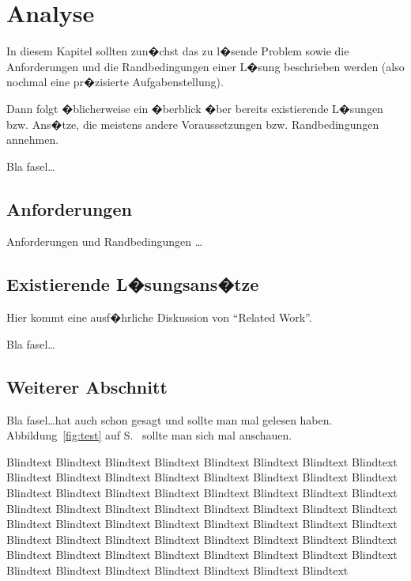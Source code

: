 
\chapter{Analyse}
\label{ch:Analyse}
In diesem Kapitel sollten zun�chst das zu l�sende Problem
sowie die Anforderungen und die Randbedingungen
einer L�sung beschrieben werden (also nochmal
eine pr�zisierte Aufgabenstellung).

Dann folgt �blicherweise ein �berblick �ber bereits existierende
L�sungen bzw. Ans�tze, die meistens andere Voraussetzungen bzw.
Randbedingungen annehmen.

Bla fasel\ldots

\section{Anforderungen}
\label{ch:Analyse:sec:Anforderungen}
Anforderungen und Randbedingungen \ldots

\section{Existierende L�sungsans�tze}
\label{ch:Analyse:sec:RelatedWork}

Hier kommt eine ausf�hrliche Diskussion
von "`Related Work"'.

Bla fasel\ldots

\section{Weiterer Abschnitt}
\label{ch:Analyse:sec:Abschnitt}

Bla fasel\ldots hat auch schon \cite{TB2000} gesagt und
\cite{TB98,JSAC96,qosr} sollte man mal gelesen haben.
Abbildung~\ref{fig:test} auf S.~\pageref{fig:test} sollte man
sich mal anschauen.

Blindtext Blindtext Blindtext Blindtext Blindtext Blindtext Blindtext
Blindtext Blindtext Blindtext Blindtext Blindtext Blindtext Blindtext
Blindtext Blindtext Blindtext Blindtext Blindtext Blindtext Blindtext
Blindtext Blindtext Blindtext Blindtext Blindtext Blindtext Blindtext
Blindtext Blindtext Blindtext Blindtext Blindtext Blindtext Blindtext
Blindtext Blindtext Blindtext Blindtext Blindtext Blindtext Blindtext
Blindtext Blindtext Blindtext Blindtext Blindtext Blindtext Blindtext
Blindtext Blindtext Blindtext Blindtext Blindtext Blindtext Blindtext
Blindtext Blindtext Blindtext Blindtext Blindtext Blindtext Blindtext


